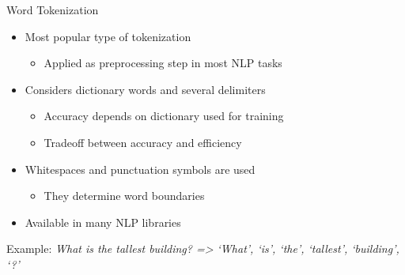 \begin{vbframe}{Word Tokenization}

\vfill

\begin{itemize}
	\item Most popular type of tokenization
		\begin{itemize}
			\item Applied as preprocessing step in most NLP tasks
		\end{itemize}
	\item Considers dictionary words and several delimiters
		\begin{itemize}
			\item Accuracy depends on dictionary used for training
			\item Tradeoff between accuracy and efficiency
		\end{itemize}
	\item Whitespaces and punctuation symbols are used 
		\begin{itemize}
			\item They determine word boundaries
		\end{itemize}
	\item Available in many NLP libraries
\end{itemize}

\vskip5mm
Example: \vskip3mm 
{\small\it What is the tallest building? => `What', `is', `the', `tallest', `building', `?'}

\vfill

\end{vbframe}


